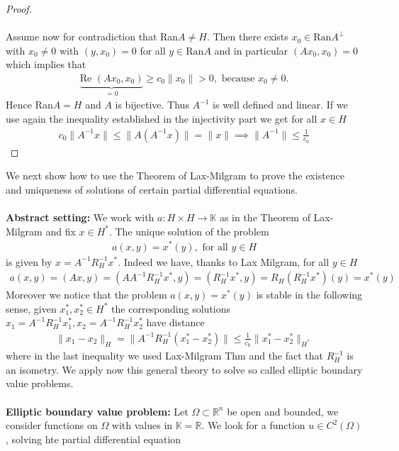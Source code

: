 \documentclass[11pt,a4paper]{article}
\theoremstyle{definition}
\begin{document}
\begin{proof}
\\\\
Assume now for contradiction that Ran$A \neq H$. Then there exists $x_0 \in \text{Ran}A^\perp$ with $x_0 \neq 0$ with $(y,x_0)=0$ for all $y \in \text{Ran}A$ and in particular $(Ax_0,x_0)=0$ which implies that 
\begin{align*}
\underbrace{\text{Re } (Ax_0,x_0)}_{=0}  \geq c_0 \|x_0\| > 0, \text{ because } x_0 \neq 0. 
\end{align*}
Hence Ran$A=H$ and $A$ is bijective. Thus $A^{-1}$ is well defined and linear. If we use again the inequality established in the injectivity part we get for all $x \in H$
\begin{align*}
c_0 \| A^{-1} x \| \leq \| A(A^{-1} x) \| = \|x\| \implies \|A^{-1} \| \leq \frac{1}{c_0}
\end{align*}
\end{proof}
\newpage
We next show how to use the Theorem of Lax-Milgram to prove the existence and uniqueness of solutions of certain partial differential equations. 
\\\\
\textbf{Abstract setting:} We work with $a: H \times H \to \mathbb{K}$ as in the Theorem of Lax-Milgram and fix $x \in H^*$. The unique solution of the problem 
\begin{align*}
a(x,y) = x^*(y), \text{ for all } y \in H
\end{align*}
is given by $x=A^{-1}R_H^{-1}x^*$. Indeed we have, thanks to Lax Milgram, for all $y \in H$ 
\begin{align*}
a(x,y)=(Ax,y)=(AA^{-1}R_H^{-1} x^*,y)= (R_H^{-1} x^*,y)=R_H(R_H^{-1} x^*)(y) = x^*(y)
\end{align*}
Moreover we notice that the problem $a(x,y)=x^*(y)$ is stable in the following sense, given $x_1^*, x_2^* \in H^*$ the corresponding solutions $x_1 = A^{-1}R_H^{-1} x_1^*, x_2= A^{-1} R_H^{-1} x_2^*$ have distance
\begin{align*}
\|x_1-x_2\|_H = \| A^{-1} R_H^{-1} (x_1^*-x_2^*) \| \leq \frac{1}{c_0}\|x_1^*-x_2^*\|_{H^*}
\end{align*}
where in the last inequality we used Lax-Milgram Thm and the fact that $R_H^{-1}$ is an isometry. We apply now this general theory to solve so called elliptic boundary value problems.
\\\\
\textbf{Elliptic boundary value problem:} Let $\Omega \subset \mathbb{R}^n$ be open and bounded, we consider functions on $\Omega$ with values in $\mathbb{K}= \mathbb{R}$. We look for a function $u \in C^2( \Omega)$, solving hte partial differential equation 
\end{document}
